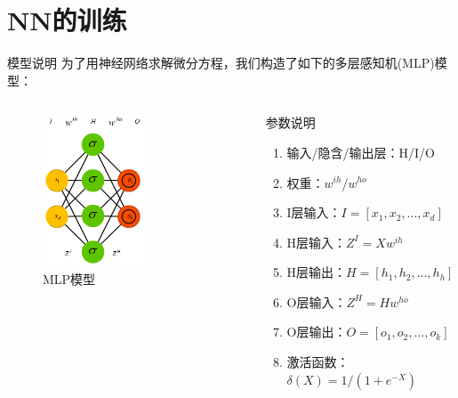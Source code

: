 \documentclass[hyperref,UTF8,11pt]{beamer}
\begin{document}
\section{NN的训练}
\begin{frame}{模型说明}
为了用神经网络求解微分方程，我们构造了如下的多层感知机(MLP)模型：
	\begin{columns}
        \begin{column}{0.4\textwidth}
            \begin{figure}
				\centering
				\includegraphics[width=0.6\textwidth]{./pic/nn.png}
				\caption{MLP模型}\label{fig:MLP}
			\end{figure}
        \end{column}
		
        \begin{column}{0.6\textwidth}
		\begin{block}{参数说明}
		\begin{enumerate}
			\item 输入/隐含/输出层：H/I/O
			\item 权重：$w^{ih}$/$w^{ho}$
			\item I层输入：$I=[x_1,x_2,...,x_d]$
			\item H层输入：$Z^I=Xw^{ih}$
			\item H层输出：$H=[h_1,h_2,...,h_h]$
			\item O层输入：$Z^H=Hw^{ho}$
			\item O层输出：$O=[o_1,o_2,...,o_k]$
			\item 激活函数：$\delta \left( X \right) = 1/\left( {1 + {e^{ - X}}} \right)$
		\end{enumerate}	
		\end{block}
        \end{column}
	\end{columns}
\end{frame}
\end{document}
